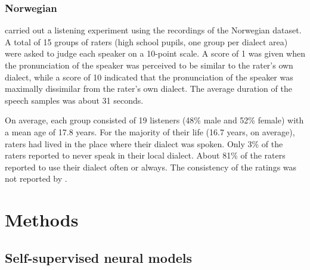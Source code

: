 \documentclass[11pt,a4paper]{article}
\begin{document}
\subsubsection{Norwegian}
\citet{gooskens2004perceptive} carried out a listening experiment using the recordings of the Norwegian dataset. A total of 15 groups of raters (high school pupils, one group per dialect area) were asked to judge each speaker on a 10-point scale. A score of 1 was given when the pronunciation of the speaker was perceived to be similar to the rater's own dialect, while a score of 10 indicated that the pronunciation of the speaker was maximally dissimilar from the rater's own dialect. The average duration of the speech samples was about 31 seconds.

On average, each group consisted of 19 listeners (48\% male and 52\% female) with a mean age of 17.8 years. For the majority of their life (16.7 years, on average), raters had lived in the place where their dialect was spoken. Only 3\% of the raters reported to never speak in their local dialect. About 81\% of the raters reported to use their dialect often or always. The consistency of the ratings was not reported by \citet{gooskens2004perceptive}. 

\section{Methods}
\label{sec:methods}
\subsection{Self-supervised neural models}
\label{sec:models}


\end{document}
